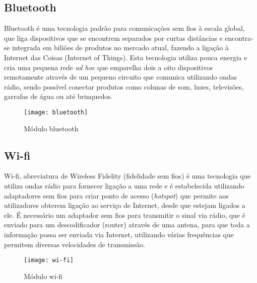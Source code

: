 \subsection{Bluetooth}
\label{subsec:bluetooth}
Bluetooth é uma tecnologia padrão para comunicações sem fios à escala global, que liga dispositivos que se encontrem separados por curtas distâncias e encontra-se integrada em biliões de produtos no mercado atual, fazendo a ligação à Internet das Coisas (Internet of Things). Esta tecnologia utiliza pouca energia e cria uma pequena rede \emph{ad hoc} que emparelha dois a oito dispositivos remotamente através de um pequeno circuito que comunica utilizando ondas rádio, sendo possível conectar produtos como colunas de som, luzes, televisões, garrafas de água ou até brinquedos.
\begin{figure}[htbp]
	\centering
	\texttt{[image: bluetooth]}
	\caption{Módulo bluetooth}
	\label{fig:modulo_bluetooth}
\end{figure}

\subsection{Wi-fi}
\label{subsec:wi-fi}
Wi-fi, abreviatura de Wireless Fidelity (fidelidade sem fios) é uma tecnologia que utiliza ondas rádio para fornecer ligação a uma rede e é estabelecida utilizando adaptadores sem fios para criar ponto de acesso (\emph{hotspot}) que permite aos utilizadores obterem ligação ao serviço de Internet, desde que estejam ligados a ele. É necessário um adaptador sem fios para transmitir o sinal via rádio, que é enviado para um descodificador (router) através de uma antena, para que toda a informação possa ser enviada via Internet, utilizando várias frequências que permitem diversas velocidades de transmissão.
\begin{figure}[htbp]
	\centering
	\texttt{[image: wi-fi]}
	\caption{Módulo wi-fi}
	\label{fig:modulo_wifi}
\end{figure}

